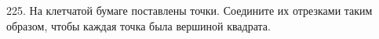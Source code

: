 225. На клетчатой бумаге поставлены точки. Соедините их отрезками таким образом, чтобы каждая точка была вершиной квадрата.
\begin{center}
\begin{figure}[ht!]
\end{figure}
\end{center}
